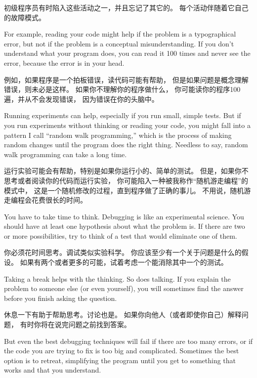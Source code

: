 \documentclass[10pt]{book}
\begin{document}
\begin{CJK}{UTF8}{gbsn}
初级程序员有时陷入这些活动之一，并且忘记了其它的。
每个活动伴随着它自己的故障模式。

For example, reading your code might help if the problem is a
typographical error, but not if the problem is a conceptual
misunderstanding.  If you don't understand what your program does, you
can read it 100 times and never see the error, because the error is in
your head.

例如，如果程序是一个拍板错误，读代码可能有帮助，
但是如果问题是概念理解错误，则未必是这样。
如果你不理解你的程序做什么，
你可能读你的程序100遍，并从不会发现错误，
因为错误在你的头脑中。

Running experiments can help, especially if you run small, simple
tests.  But if you run experiments without thinking or reading your
code, you might fall into a pattern I call ``random walk programming,''
which is the process of making random changes until the program
does the right thing.  Needless to say, random walk programming
can take a long time.

运行实验可能会有帮助，特别是如果你运行小的、简单的测试。
但是，如果你不思考或者阅读你的代码而运行实验，
你可能陷入一种被我称作``随机游走编程''的模式中，
这是一个随机修改的过程，直到程序做了正确的事儿。
不用说，随机游走编程会花费很长的时间。

You have to take time to think.  Debugging is like an
experimental science.  You should have at least one hypothesis about
what the problem is.  If there are two or more possibilities, try to
think of a test that would eliminate one of them.

你必须花时间思考。调试类似实验科学。
你应该至少有一个关于问题是什么的假设。
如果有两个或者更多的可能，试着考虑一个能消除其中一个的测试。

Taking a break helps with the thinking.  So does talking.
If you explain the problem to someone else (or even yourself), you
will sometimes find the answer before you finish asking the question.

休息一下有助于帮助思考。讨论也是。
如果你向他人（或者即使你自己）解释问题，
有时你将在说完问题之前找到答案。

But even the best debugging techniques will fail if there are too many
errors, or if the code you are trying to fix is too big and
complicated.  Sometimes the best option is to retreat, simplifying the
program until you get to something that works and that you
understand.


\end{CJK}
\end{document}
